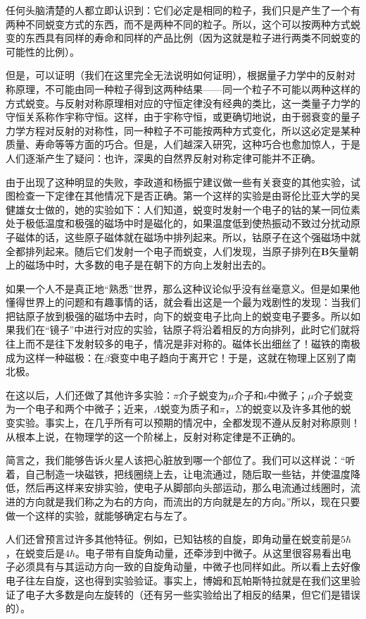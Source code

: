 任何头脑清楚的人都立即认识到：它们必定是相同的粒子，我们只是产生了一个有两种不同蜕变方式的东西，而不是两种不同的粒子。所以，这个可以按两种方式蜕变的东西具有同样的寿命和同样的产品比例（因为这就是粒子进行两类不同蜕变的可能性的比例）。

但是，可以证明（我们在这里完全无法说明如何证明），根据量子力学中的反射对称原理，不可能由同一种粒子得到这两种结果——同一个粒子不可能以两种这样的方式蜕变。与反射对称原理相对应的守恒定律没有经典的类比，这一类量子力学的守恒关系称作宇称守恒。这样，由于宇称守恒，或更确切地说，由于弱衰变的量子力学方程对反射的对称性，同一种粒子不可能按两种方式变化，所以这必定是某种质量、寿命等等方面的巧合。但是，人们越深入研究，这种巧合也愈加惊人，于是人们逐渐产生了疑问：也许，深奥的自然界反射对称定律可能并不正确。

由于出现了这种明显的失败，李政道和杨振宁建议做一些有关衰变的其他实验，试图检查一下定律在其他情况下是否正确。第一个这样的实验是由哥伦比亚大学的吴健雄女士做的，她的实验如下：人们知道，蜕变时发射一个电子的钴的某一同位素处于极低温度和极强的磁场中时是磁化的，如果温度低到使热振动不致过分扰动原子磁体的话，这些原子磁体就在磁场中排列起来。所以，钴原子在这个强磁场中就全都排列起来。随后它们发射一个电子而蜕变，人们发现，当原子排列在$\boldsymbol{B}$矢量朝上的磁场中时，大多数的电子是在朝下的方向上发射出去的。

如果一个人不是真正地“熟悉”世界，那么这种议论似乎没有丝毫意义。但是如果他懂得世界上的问题和有趣事情的话，就会看出这是一个最为戏剧性的发现：当我们把钴原子放到极强的磁场中去时，向下的蜕变电子比向上的蜕变电子要多。所以如果我们在“镜子”中进行对应的实验，钴原子将沿着相反的方向排列，此时它们就将往上而不是往下发射较多的电子，情况是非对称的。磁体长出细丝了！磁铁的南极成为这样一种磁极：在$\beta$衰变中电子趋向于离开它！于是，这就在物理上区别了南北极。

在这以后，人们还做了其他许多实验：$\pi$介子蜕变为$\mu$介子和$\nu$中微子；$\mu$介子蜕变为一个电子和两个中微子；近来，$\Lambda$蜕变为质子和$\pi$，$\Sigma$的蜕变以及许多其他的蜕变实验。事实上，在几乎所有可以预期的情况中，全都发现不遵从反射对称原则！从根本上说，在物理学的这一个阶梯上，反射对称定律是不正确的。

简言之，我们能够告诉火星人该把心脏放到哪一个部位了。我们可以这样说：“听着，自己制造一块磁铁，把线圈绕上去，让电流通过，随后取一些钴，并使温度降低，然后再这样来安排实验，使电子从脚部向头部运动，那么电流通过线圈时，流进的方向就是我们称之为右的方向，而流出的方向就是左的方向。”所以，现在只要做一个这样的实验，就能够确定右与左了。

人们还曾预言过许多其他特征。例如，已知钴核的自旋，即角动量在蜕变前是$5\hbar$，在蜕变后是$4\hbar$。电子带有自旋角动量，还牵涉到中微子。从这里很容易看出电子必须具有与其运动方向一致的自旋角动量，中微子也同样如此。所以看上去好像电子往左自旋，这也得到实验验证。事实上，博姆和瓦帕斯特拉就是在我们这里验证了电子大多数是向左旋转的（还有另一些实验给出了相反的结果，但它们是错误的）。

